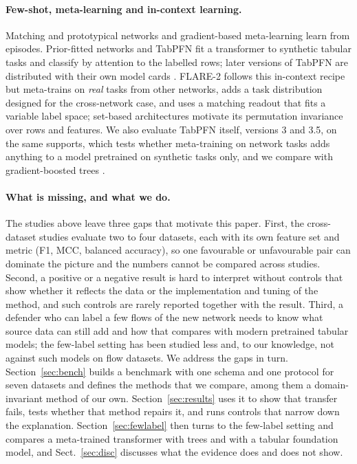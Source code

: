 \documentclass[11pt]{article}
\begin{document}
\paragraph{Few-shot, meta-learning and in-context learning.}
Matching and prototypical networks \citep{vinyals2016matching,snell2017prototypical} and gradient-based meta-learning \citep{finn2017maml} learn from episodes.
Prior-fitted networks \citep{muller2022pfn} and TabPFN \citep{hollmann2025tabpfn} fit a transformer to synthetic tabular tasks and classify by attention to the labelled rows; later versions of TabPFN are distributed with their own model cards \citep{priorlabs2026tabpfn3}.
FLARE-2 follows this in-context recipe but meta-trains on \emph{real} tasks from other networks, adds a task distribution designed for the cross-network case, and uses a matching readout that fits a variable label space; set-based architectures \citep{lee2019settransformer} motivate its permutation invariance over rows and features.
We also evaluate TabPFN itself, versions 3 and 3.5, on the same supports, which tests whether meta-training on network tasks adds anything to a model pretrained on synthetic tasks only, and we compare with gradient-boosted trees \citep{prokhorenkova2018catboost}.

\paragraph{What is missing, and what we do.}
The studies above leave three gaps that motivate this paper.
First, the cross-dataset studies evaluate two to four datasets, each with its own feature set and metric (F1, MCC, balanced accuracy), so one favourable or unfavourable pair can dominate the picture and the numbers cannot be compared across studies.
Second, a positive or a negative result is hard to interpret without controls that show whether it reflects the data or the implementation and tuning of the method, and such controls are rarely reported together with the result.
Third, a defender who can label a few flows of the new network needs to know what source data can still add and how that compares with modern pretrained tabular models; the few-label setting has been studied less and, to our knowledge, not against such models on flow datasets.
We address the gaps in turn.
Section~\ref{sec:bench} builds a benchmark with one schema and one protocol for seven datasets and defines the methods that we compare, among them a domain-invariant method of our own.
Section~\ref{sec:results} uses it to show that transfer fails, tests whether that method repairs it, and runs controls that narrow down the explanation.
Section~\ref{sec:fewlabel} then turns to the few-label setting and compares a meta-trained transformer with trees and with a tabular foundation model, and Sect.~\ref{sec:disc} discusses what the evidence does and does not show.
\end{document}
